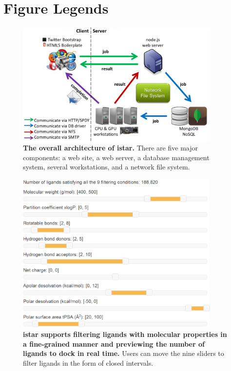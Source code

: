 \documentclass[10pt]{article}
\begin{document}


\section*{Figure Legends}

\begin{figure}[!ht]
\begin{center}
\includegraphics[width=4in]{Architecture.eps}
\end{center}
\caption{
{\bf The overall architecture of istar.} There are five major components: a web site, a web server, a database management system, several workstations, and a network file system.
}
\label{Architecture}
\end{figure}

\begin{figure}[!ht]
\begin{center}
\includegraphics[width=4in]{Slider.eps}
\end{center}
\caption{
{\bf istar supports filtering ligands with molecular properties in a fine-grained manner and previewing the number of ligands to dock in real time.} Users can move the nine sliders to filter ligands in the form of closed intervals.
}
\label{Slider}
\end{figure}
\end{document}
